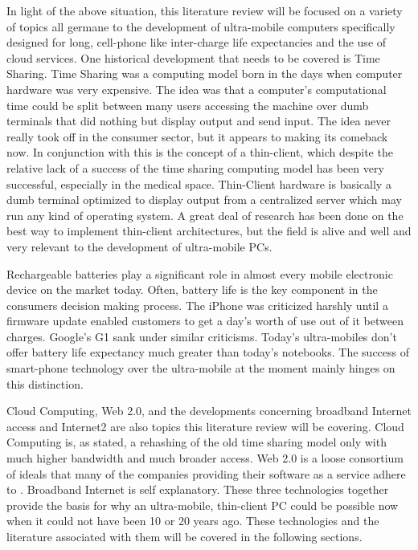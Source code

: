 \documentclass[12pt,oneside,letterpaper,titlepage]{article}
\begin{document}
In light of the above situation, this literature review will be focused on a
variety of topics all germane to the development of ultra-mobile computers
specifically designed for long, cell-phone like inter-charge life expectancies
and the use of cloud services.  One historical development that needs to be
covered is Time Sharing.  Time Sharing was a computing model born in the days
when computer hardware was very expensive.  The idea was that a computer's
computational time could be split between many users accessing the machine over
dumb terminals that did nothing but display output and send input.  The idea
never really took off in the consumer sector, but it appears to making its
comeback now.  In conjunction with this is the concept of a thin-client, which
despite the relative lack of a success of the time sharing computing model has
been very successful, especially in the medical space.  Thin-Client hardware is
basically a dumb terminal optimized to display output from a centralized server
which may run any kind of operating system.  A great deal of research has been
done on the best way to implement thin-client architectures, but the field is
alive and well and very relevant to the development of ultra-mobile PCs.

Rechargeable batteries play a significant role in almost every mobile electronic
device on the market today.  Often, battery life is the key component in the
consumers decision making process.  The iPhone was criticized harshly until a
firmware update enabled customers to get a day's worth of use out of it between
charges.  Google's G1 sank under similar criticisms.  Today's ultra-mobiles
don't offer battery life expectancy much greater than today's notebooks.  The
success of smart-phone technology over the ultra-mobile at the moment mainly
hinges on this distinction.

Cloud Computing, Web 2.0, and the developments concerning broadband Internet
access and Internet2 are also topics this literature review will be covering.
Cloud Computing is, as stated, a rehashing of the old time sharing model only
with much higher bandwidth and much broader access.  Web 2.0 is a loose
consortium of ideals that many of the companies providing their software as a
service adhere to \citep{oreilly2007}.  Broadband Internet is self explanatory.
These three technologies together provide the basis for why an ultra-mobile,
thin-client PC could be possible now when it could not have been 10 or 20 years
ago.  These technologies and the literature associated with them will be covered
in the following sections.
\end{document}
